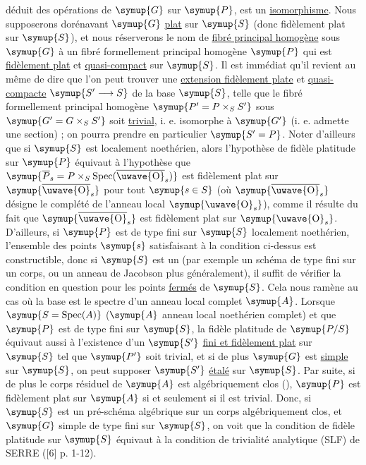 déduit des opérations de $\symup{G}$ sur $\symup{P}$, est un \uline{isomorphisme}. Nous supposerons
dorénavant $\symup{G}$ \uline{plat} sur $\symup{S}$ (donc fidèlement plat sur $\symup{S}$), et nous réserverons
le nom de \uline{fibré principal homogène} sous $\symup{G}$ à un fibré formellement principal
homogène $\symup{P}$ qui est \uline{fidèlement plat} et \uline{quasi-compact} sur $\symup{S}$. Il est immédiat
qu'il revient au même de dire que l'on peut trouver une \uline{extension fidèlement plate} et \uline{quasi-compacte} $\symup{S'\longrightarrow S}$ de la base $\symup{S}$, telle que le
fibré formellement principal homogène
$\symup{P'=P\times_SS'}$
sous $\symup{G'=G\times_SS'}$ soit \uline{trivial}, i. e. isomorphe à $\symup{G'}$ (i. e. admette une
section) ; on pourra prendre en particulier $\symup{S'=P}$. Noter d'ailleurs que si
$\symup{S}$ est localement noethérien, alors l'hypothèse de fidèle platitude sur $\symup{P}$
équivaut à l'hypothèse que
$\symup{\overline P_s=P\times_S\operatorname{Spec}(\overline{\text{\uwave{O}}}_s)}$
est fidèlement plat sur $\symup{\overline{\text{\uwave{O}}}_s}$ pour tout $\symup{s\in S}$ (où
$\symup{\overline{\text{\uwave{O}}}_s}$ désigne le complété de l'anneau local
$\symup{\text{\uwave{O}}_s}$), comme il résulte du fait que $\symup{\overline{\text{\uwave{O}}}_s}$ est
fidèlement plat sur $\symup{\text{\uwave{O}}_s}$. D'ailleurs, si $\symup{P}$ est de type fini sur
$\symup{S}$ localement noethérien, l'ensemble des points $\symup{s}$ satisfaisant à la
condition ci-dessus est constructible, donc si $\symup{S}$ est un  (par exemple un schéma de type fini sur un corps, ou un anneau de Jacobson plus généralement), il suffit de vérifier la condition en question
pour les points \uline{fermés} de $\symup{S}$. Cela nous ramène au cas où la base est le
spectre d'un anneau local complet $\symup{A}$. Lorsque $\symup{S=\operatorname{Spec}(A)}$
($\symup{A}$ anneau local noethérien complet) et que $\symup{P}$ est de type fini sur $\symup{S}$, la
fidèle platitude de $\symup{P/S}$ équivaut aussi à l'existence d'un $\symup{S'}$ \uline{fini et fidèlement plat}
sur $\symup{S}$ tel que $\symup{P'}$ soit trivial, et si de plus $\symup{G}$ est \uline{simple} sur $\symup{S}$, on
peut supposer $\symup{S'}$ \uline{étalé} sur $\symup{S}$. Par suite, si de plus le corps résiduel de
$\symup{A}$ est algébriquement clos (), $\symup{P}$ est fidèlement plat sur
$\symup{A}$ si et seulement si il est trivial. Donc, si $\symup{S}$ est un pré-schéma
algébrique sur un corps algébriquement clos, et $\symup{G}$ simple de type fini sur
$\symup{S}$, on voit que la condition de fidèle platitude sur $\symup{S}$ équivaut à la
condition de trivialité analytique (SLF) de SERRE ([6] p. 1-12).


